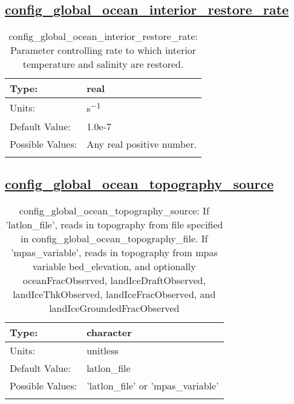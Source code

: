 \subsection[config\_global\_ocean\_interior\_restore\_rate]{\hyperref[sec:nm_tab_global_ocean]{config\_global\_ocean\_interior\_restore\_rate}}
\label{subsec:nm_sec_config_global_ocean_interior_restore_rate}
\begin{center}
\begin{longtable}{| p{2.0in} || p{4.0in} |}
    \hline
    Type: & real \\
    \hline
    Units: & \si{s^{-1}} \\
    \hline
    Default Value: & 1.0e-7 \\
    \hline
    Possible Values: & Any real positive number. \\
    \hline
    \caption{config\_global\_ocean\_interior\_restore\_rate: Parameter controlling rate to which interior temperature and salinity are restored.}
\end{longtable}
\end{center}
\subsection[config\_global\_ocean\_topography\_source]{\hyperref[sec:nm_tab_global_ocean]{config\_global\_ocean\_topography\_source}}
\label{subsec:nm_sec_config_global_ocean_topography_source}
\begin{center}
\begin{longtable}{| p{2.0in} || p{4.0in} |}
    \hline
    Type: & character \\
    \hline
    Units: & \si{unitless} \\
    \hline
    Default Value: & latlon\_file \\
    \hline
    Possible Values: & 'latlon\_file' or 'mpas\_variable' \\
    \hline
    \caption{config\_global\_ocean\_topography\_source: If 'latlon\_file', reads in topography from file specified in config\_global\_ocean\_topography\_file. If 'mpas\_variable', reads in topography from mpas variable bed\_elevation, and optionally oceanFracObserved, landIceDraftObserved, landIceThkObserved, landIceFracObserved, and landIceGroundedFracObserved}
\end{longtable}
\end{center}
